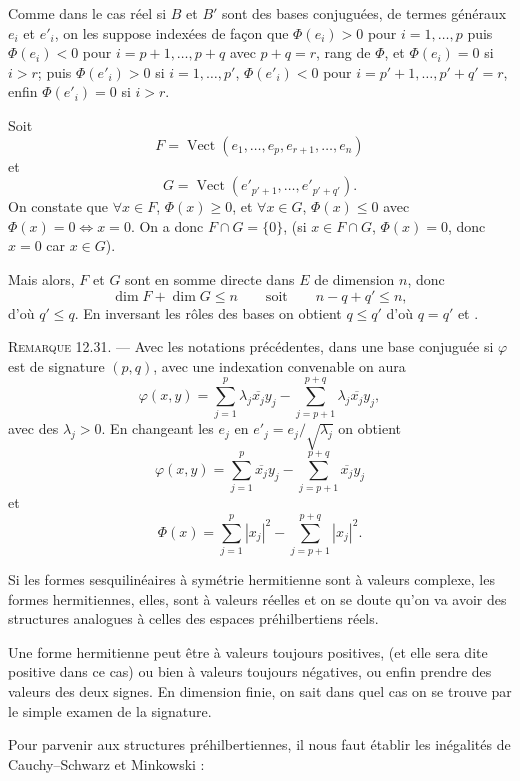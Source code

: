 Comme dans le cas réel si $B$ et $B'$ sont des bases conjuguées, de termes généraux $e_i$ et $e'_i$, on les suppose indexées de façon que $\Phi(e_i)>0$ pour $i=1,\ldots,p$ puis $\Phi(e_i)<0$ pour $i=p+1,\ldots,p+q$ avec $p+q=r$, rang de $\Phi$, et $\Phi(e_i)=0$ si $i>r$; puis $\Phi(e'_i)>0$ si $i=1,\ldots,p'$, $\Phi(e'_i)<0$ pour $i=p'+1,\ldots,p'+q'=r$, enfin $\Phi(e'_i)=0$ si $i>r$.

Soit
\[
F=\operatorname{Vect}(e_1,\ldots,e_p,e_{r+1},\ldots,e_n)
\]
et
\[
G=\operatorname{Vect}(e'_{p'+1},\ldots,e'_{p'+q'}).
\]
On constate que $\forall x\in F$, $\Phi(x)\ge0$, et $\forall x\in G$, $\Phi(x)\le0$ avec $\Phi(x)=0\Longleftrightarrow x=0$. On a donc $F\cap G=\{0\}$, (si $x\in F\cap G$, $\Phi(x)=0$, donc $x=0$ car $x\in G$).

Mais alors, $F$ et $G$ sont en somme directe dans $E$ de dimension $n$, donc
\[
\dim F+\dim G\le n\qquad\text{soit}\qquad n-q+q'\le n,
\]
d'où $q'\le q$. En inversant les rôles des bases on obtient $q\le q'$ d'où $q=q'$ et . \bookend

\medskip\noindent\textsc{Remarque 12.31.} --- Avec les notations précédentes, dans une base conjuguée si $\varphi$ est de signature $(p,q)$, avec une indexation convenable on aura
\[
\varphi(x,y)=\sum_{j=1}^p\lambda_j\overline{x_j}y_j-
\sum_{j=p+1}^{p+q}\lambda_j\overline{x_j}y_j,
\]
avec des $\lambda_j>0$. En changeant les $e_j$ en $e'_j=e_j/\sqrt{\lambda_j}$ on obtient
\[
\varphi(x,y)=\sum_{j=1}^p\overline{x_j}y_j-
\sum_{j=p+1}^{p+q}\overline{x_j}y_j
\]
et
\[
\Phi(x)=\sum_{j=1}^p|x_j|^2-
\sum_{j=p+1}^{p+q}|x_j|^2.
\]


Si les formes sesquilinéaires à symétrie hermitienne sont à valeurs complexe, les formes hermitiennes, elles, sont à valeurs réelles et on se doute qu'on va avoir des structures analogues à celles des espaces préhilbertiens réels.

Une forme hermitienne peut être à valeurs toujours positives, (et elle sera dite positive dans ce cas) ou bien à valeurs toujours négatives, ou enfin prendre des valeurs des deux signes. En dimension finie, on sait dans quel cas on se trouve par le simple examen de la signature.

Pour parvenir aux structures préhilbertiennes, il nous faut établir les inégalités de Cauchy--Schwarz et Minkowski :

